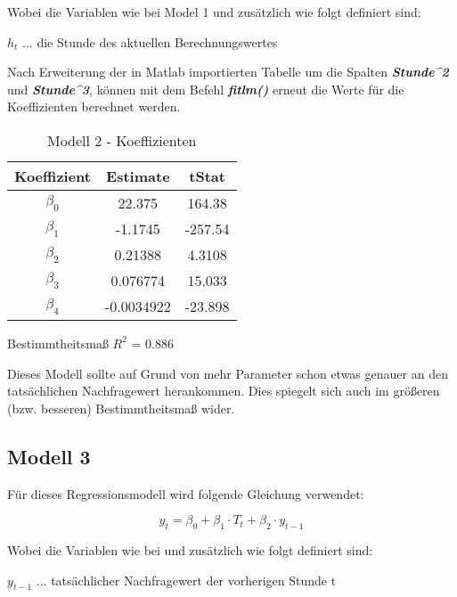 \documentclass{eegreport}
\begin{document}
Wobei die Variablen wie bei Model 1 und zusätzlich wie folgt definiert sind:
\begin{center}
\parbox{10cm}{$h_t$ ... die Stunde des aktuellen Berechnungswertes}
\end{center}

Nach Erweiterung der in Matlab importierten Tabelle um die Spalten \textbf{\emph{Stunde\textasciicircum2}} und \textbf{\emph{Stunde\textasciicircum3}}, können mit dem Befehl \textbf{\emph{fitlm()}} erneut die Werte für die Koeffizienten berechnet werden.
\newpage
\begin{table}[h]
\begin{center}
\begin{tabular}{|c|c|c|}
\hline 
 Koeffizient & Estimate & tStat \\ 
\hline 
$\beta_0$ & 22.375 & 164.38 \\ 
\hline 
$\beta_1$ & -1.1745 & -257.54 \\ 
\hline 
$\beta_2$ & 0.21388 & 4.3108 \\ 
\hline 
$\beta_3$ & 0.076774 & 15.033 \\ 
\hline 
$\beta_4$ & -0.0034922 & -23.898 \\ 
\hline 
\end{tabular} 
\end{center}
\caption{Modell 2 - Koeffizienten}
\label{modell2koeff}
\end{table}

Bestimmtheitsmaß $R^2$ = 0.886

Dieses Modell sollte auf Grund von mehr Parameter schon etwas genauer an den tatsächlichen Nachfragewert herankommen. Dies spiegelt sich auch im größeren (bzw. besseren) Bestimmtheitsmaß wider.

\subsection{Modell 3}
Für dieses Regressionsmodell wird folgende Gleichung verwendet:

\begin{equation}\label{Gleichung Modell 3}
y_t = \beta_0 + \beta_1 \cdot T_t + \beta_2 \cdot y_{t-1}
\end{equation}

Wobei die Variablen wie bei  und zusätzlich wie folgt definiert sind:

\begin{center}
\parbox{10cm}{$y_{t-1}$ ... tatsächlicher Nachfragewert der vorherigen Stunde t}
\end{center}
\end{document}
